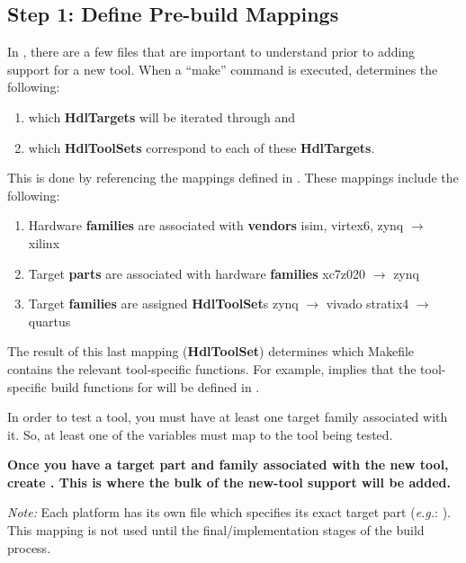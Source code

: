 \subsection{Step 1: Define Pre-build Mappings}
\label{prebuild}
In , there are a few files that are important to understand prior to adding support for a new tool. When a ``make'' command is executed,  determines the following:
\begin{enumerate}
\item which \textbf{HdlTargets} will be iterated through and
\item which \textbf{HdlToolSets} correspond to each of these \textbf{HdlTargets}.
\end{enumerate}
This is done by referencing the mappings defined in . These mappings include the following:
\begin{enumerate}
\item Hardware \textbf{families} are associated with \textbf{vendors}
\subitem isim, virtex6, zynq  $\rightarrow$ xilinx
\item Target \textbf{parts} are associated with hardware \textbf{families}
\subitem xc7z020 $\rightarrow$ zynq
\item Target \textbf{families} are assigned \textbf{HdlToolSet}s
\subitem zynq $\rightarrow$ vivado
\subitem stratix4 $\rightarrow$ quartus
\end{enumerate}
The result of this last mapping (\textbf{HdlToolSet}) determines which Makefile contains the relevant tool-specific functions. For example,  implies that the tool-specific build functions for  will be defined in .\newline

In order to test a tool, you must have at least one target family associated with it. So, at least one of the  variables must map to the tool being tested.\newline

\textbf{Once you have a target part and family associated with the new tool, create . This is where the bulk of the new-tool support will be added.}\newline

\textit{Note: }Each platform has its own  file which specifies its exact target part (\textit{e.g.}: ). This mapping is not used until the final/implementation stages of the build process.

